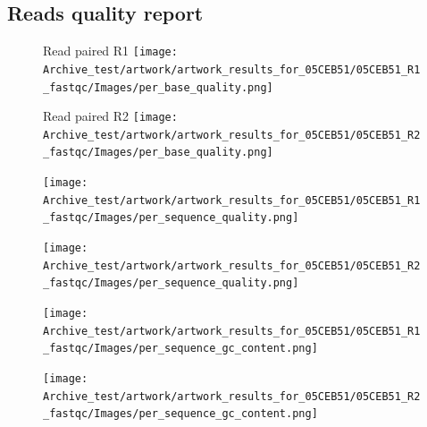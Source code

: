 \documentclass[a4paper]{article}
\begin{document}


\subsection{Reads quality report}


\begin{figure}[h]
    \begin{minipage}[c]{.46\linewidth}
	\hspace*{-0.5cm}
        \centering
		Read paired R1
        \texttt{[image: Archive\_test/artwork/artwork\_results\_for\_05CEB51/05CEB51\_R1\_fastqc/Images/per\_base\_quality.png]} %
    \end{minipage}
    \hfill%
    \begin{minipage}[c]{.46\linewidth}
        \centering
		Read paired R2
        \texttt{[image: Archive\_test/artwork/artwork\_results\_for\_05CEB51/05CEB51\_R2\_fastqc/Images/per\_base\_quality.png]} %
    \end{minipage}
\end{figure}

\begin{figure}[h]
    \begin{minipage}[c]{.46\linewidth}
	\hspace*{-0.5cm}
        \centering
        \texttt{[image: Archive\_test/artwork/artwork\_results\_for\_05CEB51/05CEB51\_R1\_fastqc/Images/per\_sequence\_quality.png]} %
    \end{minipage}
    \hfill%
    \begin{minipage}[c]{.46\linewidth}
        \centering
        \texttt{[image: Archive\_test/artwork/artwork\_results\_for\_05CEB51/05CEB51\_R2\_fastqc/Images/per\_sequence\_quality.png]} %
    \end{minipage}
\end{figure}

\begin{figure}[h]
    \begin{minipage}[c]{.46\linewidth}
	\hspace*{-0.5cm}
        \centering
        \texttt{[image: Archive\_test/artwork/artwork\_results\_for\_05CEB51/05CEB51\_R1\_fastqc/Images/per\_sequence\_gc\_content.png]} %
    \end{minipage}
    \hfill%
    \begin{minipage}[c]{.46\linewidth}
        \centering
        \texttt{[image: Archive\_test/artwork/artwork\_results\_for\_05CEB51/05CEB51\_R2\_fastqc/Images/per\_sequence\_gc\_content.png]} %
    \end{minipage}
\end{figure}
\end{document}
